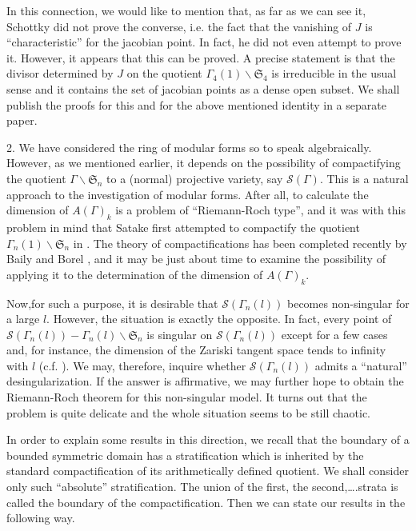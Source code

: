 In this connection, we would like to mention that, as far as we can see it, Schottky did not prove the converse, i.e. the fact that the vanishing of $J$ is ``characteristic'' for the jacobian point. In fact, he did not even attempt to prove it. However, it appears that this can be proved. A precise statement is that the divisor determined by $J$ on the quotient $\Gamma_{4}(1)\backslash \mathfrak{S}_{4}$ is irreducible in the usual sense and it contains the set of jacobian points as a dense open subset. We shall publish the proofs for this and for the above mentioned identity in a separate paper.

2. We have considered the ring of modular forms so to speak algebraically. However, as we mentioned earlier, it depends on the possibility of compactifying the quotient $\Gamma\backslash \mathfrak{S}_{n}$ to a (normal) projective variety, say $\mathscr{S}(\Gamma)$. This is a natural approach to the investigation of modular forms. After all, to calculate the dimension of $A(\Gamma)_{k}$ is a problem of ``Riemann-Roch type'', and it was with this problem in mind that Satake first attempted to compactify the quotient $\Gamma_{n}(1)\backslash\mathfrak{S}_{n}$ in \cite{art12-key18}. The theory of compactifications has been completed recently by Baily and Borel \cite{art12-key2}, and it may be just about time to examine the possibility of applying it to the determination of the dimension of $A(\Gamma)_{k}$.

\eject

Now,\pageoriginale for such a purpose, it is desirable that $\mathscr{S}(\Gamma_{n}(l))$ becomes non-singular for a large $l$. However, the situation is exactly the opposite. In fact, every point of $\mathscr{S}(\Gamma_{n}(l))-\Gamma_{n}(l)\backslash \mathfrak{S}_{n}$ is singular on $\mathscr{S}(\Gamma_{n}(l))$ except for a few cases and, for instance, the dimension of the Zariski tangent space tends to infinity with $l$ (c.f. \cite{art12-key10}). We may, therefore, inquire whether $\mathscr{S}(\Gamma_{n}(l))$ admits a ``natural'' desingularization. If the answer is affirmative, we may further hope to obtain the Riemann-Roch theorem for this non-singular model. It turns out that the problem is quite delicate and the whole situation seems to be still chaotic.

In order to explain some results in this direction, we recall that the boundary of a bounded symmetric domain has a stratification which is inherited by the standard compactification of its arithmetically defined quotient. We shall consider only such ``absolute'' stratification. The union of the first, the second,\ldots.strata is called the boundary of the compactification. Then we can state our results in the following way.

